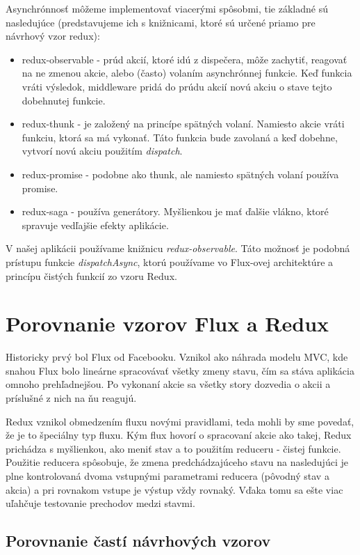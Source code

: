 Asynchrónnosť môžeme implementovať viacerými spôsobmi, tie základné sú nasledujúce (predstavujeme ich s knižnicami, ktoré sú určené priamo pre návrhový vzor redux):
\begin{itemize}
  \item redux-observable - prúd akcií, ktoré idú z dispečera, môže zachytiť, reagovať na ne zmenou akcie, alebo (často) volaním asynchrónnej funkcie. Keď funkcia vráti výsledok, middleware pridá do prúdu akcií novú akciu o stave tejto dobehnutej funkcie.
  \item redux-thunk - je založený na princípe spätných volaní. Namiesto akcie vráti funkciu, ktorá sa má vykonať. Táto funkcia bude zavolaná a keď dobehne, vytvorí novú akciu použitím \emph{dispatch}.
  \item redux-promise - podobne ako thunk, ale namiesto spätných volaní používa promise.
  \item redux-saga - používa generátory. Myšlienkou je mať ďalšie vlákno, ktoré spravuje vedľajšie efekty aplikácie.
\end{itemize}

V našej aplikácii používame knižnicu \emph{redux-observable}. Táto možnosť je podobná prístupu funkcie \emph{dispatchAsync}, ktorú používame vo Flux-ovej architektúre a princípu čistých funkcií zo vzoru Redux. 







\section{Porovnanie vzorov Flux a Redux}
Historicky prvý bol Flux od Facebooku. Vznikol ako náhrada modelu MVC, kde snahou Flux bolo lineárne spracovávať všetky zmeny stavu, čím sa stáva aplikácia omnoho prehľadnejšou. Po vykonaní akcie sa všetky story dozvedia o akcii a príslušné z nich na ňu reagujú.

Redux vznikol obmedzením fluxu novými pravidlami, teda mohli by sme povedať, že je to špeciálny typ fluxu. Kým flux hovorí o spracovaní akcie ako takej, Redux prichádza s myšlienkou, ako meniť stav a to použitím reduceru - čistej funkcie. Použitie reducera spôsobuje, že zmena predchádzajúceho stavu na nasledujúci je plne kontrolovaná dvoma vstupnými parametrami reducera (pôvodný stav a akcia) a pri rovnakom vstupe je výstup vždy rovnaký. Vďaka tomu sa ešte viac uľahčuje testovanie prechodov medzi stavmi.

\subsection{Porovnanie častí návrhových vzorov}

